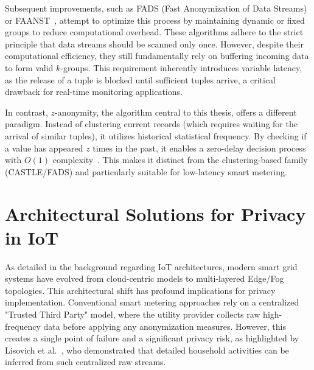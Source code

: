

Subsequent improvements, such as FADS (Fast Anonymization of Data Streams)~\cite{AnonymizationDataStreams} or FAANST~\cite{FAANST}, attempt to optimize this process by maintaining dynamic or fixed groups 
to reduce computational overhead. These algorithms adhere to the strict principle that data streams should be scanned only once. However, despite their computational efficiency, they still fundamentally rely on buffering incoming data to form valid 
$k$-groups. This requirement inherently introduces variable latency, as the release of a tuple is blocked until sufficient tuples arrive, a critical drawback for real-time monitoring applications.

In contrast, $z$-anonymity, the algorithm central to this thesis, offers a different paradigm. Instead of clustering current records (which requires waiting for the arrival of similar tuples), it utilizes historical statistical frequency. By checking if a value has appeared $z$ times in the past, it enables a zero-delay decision process with $O(1)$ complexity~\cite{zanonDataStreams}. This makes it distinct from the clustering-based family (CASTLE/FADS) and particularly suitable for low-latency smart metering.


\section{Architectural Solutions for Privacy in IoT}
\label{sec:architecturalfoundations}

As detailed in the background regarding \ac{IoT} architectures, modern smart grid systems have evolved from cloud-centric models to multi-layered Edge/Fog topologies. This architectural shift has profound implications for privacy implementation. Conventional smart metering approaches rely on a centralized "Trusted Third Party" model, where the utility provider collects raw high-frequency data before applying any anonymization measures. However, this creates a single point of failure and a significant privacy risk, as highlighted by Lisovich et al.~\cite{InferringPersonalInformationFromDRS}, who demonstrated that detailed household activities can be inferred from such centralized raw streams.

